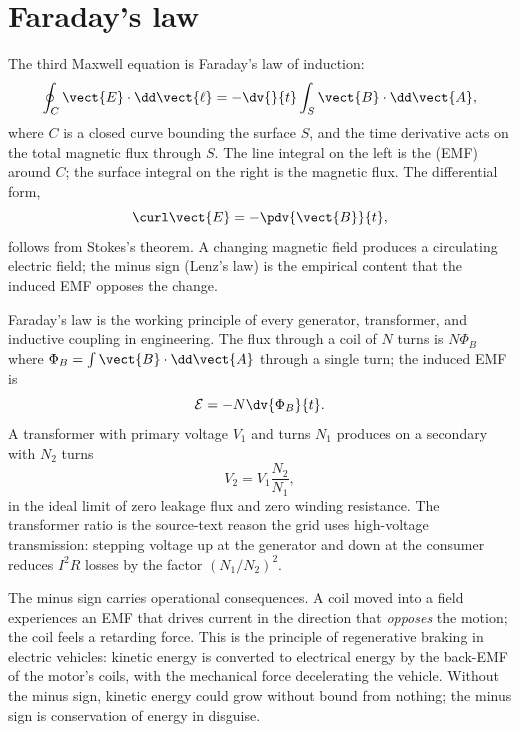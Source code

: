 \section{Faraday's law}

The third Maxwell equation is Faraday's law of induction:
\[
\oint_{C} \vect{E}\cdot \dd\vect{\ell} = -\dv{}{t}\int_{S} \vect{B}
\cdot \dd\vect{A},
\]
where $C$ is a closed curve bounding the surface $S$, and the time
derivative acts on the total magnetic flux through $S$. The line
integral on the left is the  (EMF)
around $C$; the surface integral on the right is the magnetic flux.
The differential form,
\[
\curl \vect{E} = -\pdv{\vect{B}}{t},
\]
follows from Stokes's theorem. A changing magnetic field produces a
circulating electric field; the minus sign (Lenz's law) is the
empirical content that the induced EMF opposes the change.



Faraday's law is the working principle of every generator, transformer,
and inductive coupling in engineering. The flux through a coil of $N$
turns is $N\Phi_{B}$ where $\Phi_{B} = \int \vect{B}\cdot \dd\vect{A}$
through a single turn; the induced EMF is
\[
\mathcal{E} = -N\dv{\Phi_{B}}{t}.
\]
A transformer with primary voltage $V_{1}$ and turns $N_{1}$ produces
on a secondary with $N_{2}$ turns
\[
V_{2} = V_{1}\frac{N_{2}}{N_{1}},
\]
in the ideal limit of zero leakage flux and zero winding resistance.
The transformer ratio is the source-text reason the grid uses
high-voltage transmission: stepping voltage up at the generator and
down at the consumer reduces $I^{2}R$ losses by the factor $(N_{1}/
N_{2})^{2}$.

The minus sign carries operational consequences. A coil moved into a
field experiences an EMF that drives current in the direction that
\emph{opposes} the motion; the coil feels a retarding force. This is
the principle of regenerative braking in electric vehicles: kinetic
energy is converted to electrical energy by the back-EMF of the
motor's coils, with the mechanical force decelerating the vehicle.
Without the minus sign, kinetic energy could grow without bound from
nothing; the minus sign is conservation of energy in disguise.

